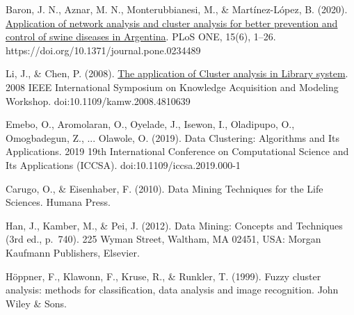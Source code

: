 \documentclass[3p,twocolumn]{elsarticle}
\begin{document}
\begin{thebibliography}{X}
 Baron, J. N., Aznar, M. N., Monterubbianesi, M., \& Martínez-López, B. (2020). \href{https://search.ebscohost.com/login.aspx?direct=true&db=aph&AN=143827917&lang=es&site=ehost-live&scope=site} {Application of network analysis and cluster analysis for better prevention and control of swine diseases in Argentina}. PLoS ONE, 15(6), 1–26. https://doi.org/10.1371/journal.pone.0234489

 Li, J., \& Chen, P. (2008). \href{https://ieeexplore.ieee.org/document/4810639} {The application of Cluster analysis in Library system}. 2008 IEEE International Symposium on Knowledge Acquisition and Modeling Workshop. doi:10.1109/kamw.2008.4810639

 Emebo, O., Aromolaran, O., Oyelade, J., Isewon, I., Oladipupo, O., Omogbadegun, Z., ... Olawole, O. (2019). Data Clustering: Algorithms and Its Applications. 2019 19th International Conference on Computational Science and Its Applications (ICCSA). doi:10.1109/iccsa.2019.000-1

 Carugo, O., \& Eisenhaber, F. (2010). Data Mining Techniques for the Life Sciences. Humana Press.
             
Han, J., Kamber, M., \& Pei, J. (2012). Data Mining: Concepts and Techniques (3rd ed., p.~740). 225 Wyman Street, Waltham, MA 02451, USA: Morgan Kaufmann Publishers, Elsevier.

 Höppner, F., Klawonn, F., Kruse, R., \& Runkler, T. (1999). Fuzzy cluster analysis: methods for classification, data analysis and image recognition. John Wiley \& Sons.


\end{thebibliography}
\end{document}
